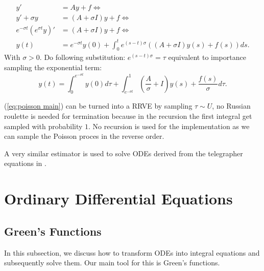 \documentclass[a4paper,12pt]{article}
\begin{document}
\begin{definition} \label{def:main poisson}
    \begin{align}
        y'                              & = A y + f \Leftrightarrow                                                                          \\
        y'+\sigma y                     & = (A + \sigma I) y + f\Leftrightarrow                                                              \\
        e^{-\sigma t} ( e^{\sigma t}y)' & = (A + \sigma I) y + f  \Leftrightarrow                                                            \\
        y(t)                            & = e^{-\sigma t} y(0) + \int_{0}^{t} e^{(s-t) \sigma} \left(  (A + \sigma I ) y(s) +f(s)\right) ds.
    \end{align}
    With $\sigma>0$. Do following substitution: $e^{(s-t)\sigma} = \tau$ equivalent to importance sampling
    the exponential term:
    \begin{equation} \label{eq:poisson main}
        y(t) = \int_{0}^{e^{-\sigma t}}  y(0) d\tau + \int_{e^{-\sigma t}}^{1} \left(  \frac{A}{\sigma} + I\right)  y(s) + \frac{f(s)}{\sigma} d\tau
        .
    \end{equation}


    (\ref{eq:poisson main}) can be turned into a RRVE by sampling $\tau \sim U$, no Russian roulette is needed for
    termination because in the recursion the first integral get sampled with probability $1$. No recursion is used
    for the implementation as we can sample the Poisson proces in the reverse order.

\end{definition}

\begin{related}
    A very similar estimator is used to solve ODEs derived from the
    telegrapher equations in \cite{acebron_monte_2016}.
\end{related}

\section{Ordinary Differential Equations}

\subsection{Green's Functions}
In this subsection, we discuss how to transform ODEs into integral equations and
subsequently solve them. Our main tool for this is Green's functions. \\
\end{document}
